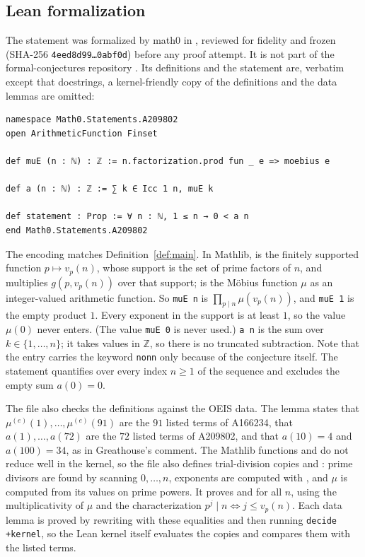 \documentclass[11pt]{amsart}
\theoremstyle{plain}
\theoremstyle{definition}
\newcommand{\Z}{\mathbb{Z}}
\newcommand{\mue}{\mu^{(e)}}
\begin{document}
\subsection*{Lean formalization}
The statement was formalized by math0 in , reviewed for fidelity and frozen (SHA-256 \texttt{4eed8d99\ldots 0abf0d}) before any proof attempt. It is not part of the formal-conjectures repository \cite{FC}. Its definitions and the statement are, verbatim except that docstrings, a kernel-friendly copy of the definitions and the data lemmas are omitted:
\begin{lstlisting}
namespace Math0.Statements.A209802
open ArithmeticFunction Finset

def muE (n : ℕ) : ℤ := n.factorization.prod fun _ e => moebius e

def a (n : ℕ) : ℤ := ∑ k ∈ Icc 1 n, muE k

def statement : Prop := ∀ n : ℕ, 1 ≤ n → 0 < a n
end Math0.Statements.A209802
\end{lstlisting}
The encoding matches Definition~\ref{def:main}. In Mathlib,  is the finitely supported function $p\mapsto v_p(n)$, whose support is the set of prime factors of $n$, and  multiplies $g(p,v_p(n))$ over that support;  is the M\"obius function $\mu$ as an integer-valued arithmetic function. So \texttt{muE n} is $\prod_{p\mid n}\mu(v_p(n))$, and \texttt{muE 1} is the empty product $1$. Every exponent in the support is at least $1$, so the value $\mu(0)$ never enters. (The value \texttt{muE 0} is never used.) \texttt{a n} is the sum over $k\in\{1,\dots,n\}$; it takes values in $\Z$, so there is no truncated subtraction. Note that the entry carries the keyword \texttt{nonn} only because of the conjecture itself. The statement quantifies over every index $n\ge1$ of the sequence and excludes the empty sum $a(0)=0$.

The file also checks the definitions against the OEIS data. The lemma  states that $\mue(1),\dots,\mue(91)$ are the $91$ listed terms of A166234,  that $a(1),\dots,a(72)$ are the $72$ listed terms of A209802, and  that $a(10)=4$ and $a(100)=34$, as in Greathouse's comment. The Mathlib functions  and  do not reduce well in the kernel, so the file also defines trial-division copies  and : prime divisors are found by scanning $0,\dots,n$, exponents are computed with , and $\mu$ is computed from its values on prime powers. It proves  and  for all $n$, using the multiplicativity of $\mu$ and the characterization $p^j\mid n\iff j\le v_p(n)$. Each data lemma is proved by rewriting with these equalities and then running \texttt{decide +kernel}, so the Lean kernel itself evaluates the copies and compares them with the listed terms.
\end{document}
